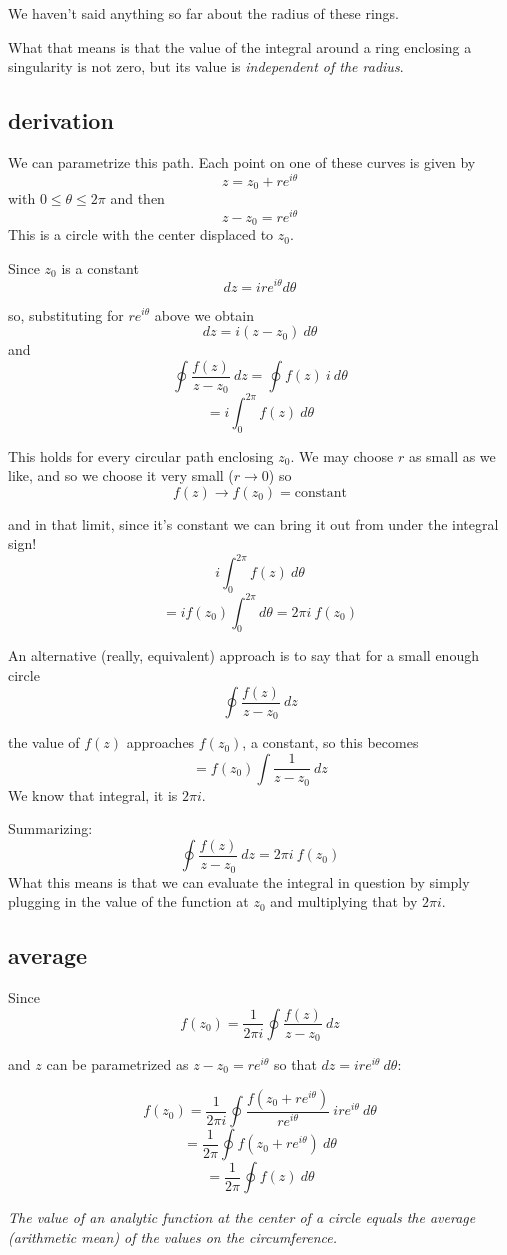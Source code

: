 \documentclass[11pt, oneside]{article}
\begin{document}
We haven't said anything so far about the radius of these rings.  

What that means is that the value of the integral around a ring enclosing a singularity is not zero, but its value is \emph{independent of the radius}.

\subsection*{derivation}

We can parametrize this path.  Each point on one of these curves is given by
\[ z = z_0 + r e^{i\theta} \]
with $0 \le \theta \le 2 \pi$ and then
\[ z - z_0 = r e^{i\theta} \]
This is a circle with the center displaced to $z_0$.

Since $z_0$ is a constant
\[ dz = i r e^{i \theta} d \theta \]

so, substituting for $r e^{i\theta}$ above we obtain
\[ dz = i(z - z_0) \ d \theta \]
and
\[ \oint \frac{f(z)}{z - z_0} \ dz = \oint f(z) \ i \ d \theta \]
\[ = i \int_0^{2\pi}  f(z) \ d \theta \]

This holds for every circular path enclosing $z_0$.  We may choose $r$ as small as we like, and so we choose it very small ($r \rightarrow 0$) so
\[ f(z) \rightarrow f(z_0) = \text{constant} \]

and in that limit, since it's constant we can bring it out from under the integral sign!
\[ i \int_0^{2\pi}  f(z) \ d \theta \]
\[ = i f(z_0) \int_0^{2\pi} d \theta = 2 \pi i \ f(z_0) \]

An alternative (really, equivalent) approach is to say that for a small enough circle
\[ \oint \frac{f(z)}{z - z_0} \ dz \]

the value of $f(z)$ approaches $f(z_0)$, a constant, so this becomes
\[ = f(z_0) \int \frac{1}{z - z_0} \ dz \]
We know that integral, it is $2 \pi i$.

Summarizing:
\[ \oint \frac{f(z)}{z - z_0} \ dz = 2 \pi i \ f(z_0) \]
What this means is that we can evaluate the integral in question by simply plugging in the value of the function at $z_0$ and multiplying that by $2 \pi i$.

\subsection*{average}
Since
\[ f(z_0) = \frac{1}{2 \pi i} \oint \frac{f(z)}{z - z_0} \ dz \]

and $z$ can be parametrized as $z - z_0 = re^{i \theta}$ so that $dz = i r e^{i \theta} \ d \theta$:

\[ f(z_0) = \frac{1}{2 \pi i} \oint \frac{f(z_0 + re^{i \theta})}{re^{i \theta} } \ i r e^{i \theta} \ d \theta \]
\[ = \frac{1}{2 \pi} \oint f(z_0 + re^{i \theta}) \ d \theta \]
\[ = \frac{1}{2 \pi} \oint f(z) \ d \theta \]

\emph{The value of an analytic function at the center of a circle equals the average (arithmetic mean) of the values on the circumference.}
\end{document}
